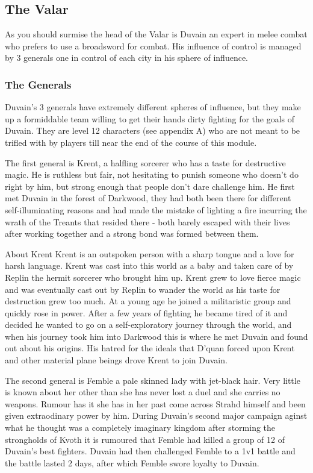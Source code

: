 \documentclass[10pt,twoside,twocolumn]{article}
\begin{document}
\subsection{The Valar}
As you should surmise the head of the Valar is Duvain an expert in melee combat who prefers to use a broadsword for combat. His influence of control is managed by 3 generals one in control of each city in his sphere of influence.

\subsubsection{The Generals}
Duvain's 3 generals have extremely different spheres of influence, but they make up a formiddable team willing to get their hands dirty fighting for the goals of Duvain. They are level 12 characters (see appendix A) who are not meant to be trifled with by players till near the end of the course of this module.

The first general is Krent, a halfling sorcerer who has a taste for destructive magic. He is ruthless but fair, not hesitating to punish someone who doesn't do right by him, but strong enough that people don't dare challenge him. He first met Duvain in the forest of Darkwood, they had both been there for different self-illuminating reasons and had made the mistake of lighting a fire incurring the wrath of the Treants that resided there - both barely escaped with their lives after working together and a strong bond was formed between them.

\begin{commentbox}{About Krent}
Krent is an outspoken person with a sharp tongue and a love for harsh language. Krent was cast into this world as a baby and taken care of by Replin the hermit sorcerer who brought him up. Krent grew to love fierce magic and was eventually cast out by Replin to wander the world as his taste for destruction grew too much. At a young age he joined a militaristic group and quickly rose in power. After a few years of fighting he became tired of it and decided he wanted to go on a self-exploratory journey through the world, and when his journey took him into Darkwood this is where he met Duvain and found out about his origins. His hatred for the ideals that D'quan forced upon Krent and other material plane beings drove Krent to join Duvain.
\end{commentbox}

The second general is Femble a pale skinned lady with jet-black hair. Very little is known about her other than she has never lost a duel and she carries no weapons. Rumour has it she has in her past come across Strahd himself and been given extraodinary power by him. During Duvain's second major campaign aginst what he thought was a completely imaginary kingdom after storming the strongholds of Kvoth it is rumoured that Femble had killed a group of 12 of Duvain's best fighters. Duvain had then challenged Femble to a 1v1 battle and the battle lasted 2 days, after which Femble swore loyalty to Duvain.
\end{document}
